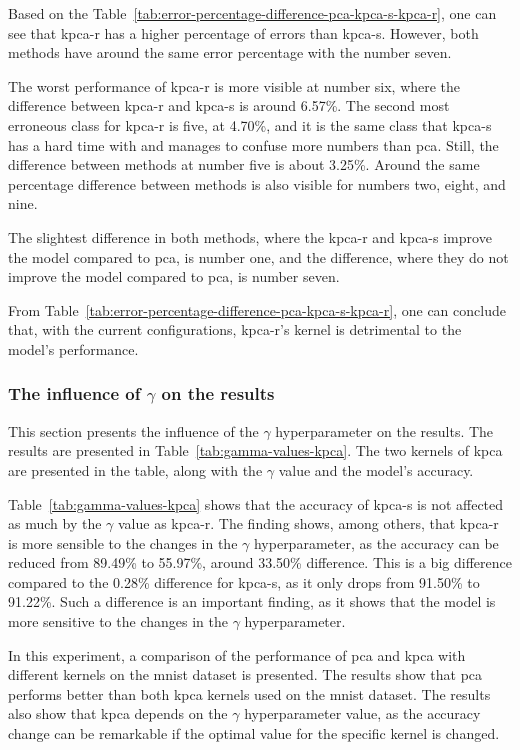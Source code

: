 Based on the Table~\ref{tab:error-percentage-difference-pca-kpca-s-kpca-r}, one can see that \gls{kpca-r} has a higher percentage of errors than \gls{kpca-s}. However, both methods have around the same error percentage with the number seven.

The worst performance of \gls{kpca-r} is more visible at number six, where the difference between \gls{kpca-r} and \gls{kpca-s} is around 6.57\%. The second most erroneous class for \gls{kpca-r} is five, at 4.70\%, and it is the same class that \gls{kpca-s} has a hard time with and manages to confuse more numbers than \gls{pca}. Still, the difference between methods at number five is about 3.25\%. Around the same percentage difference between methods is also visible for numbers two, eight, and nine.

The slightest difference in both methods, where the \gls{kpca-r} and \gls{kpca-s} improve the model compared to \gls{pca}, is number one, and the difference, where they do not improve the model compared to \gls{pca}, is number seven.

From Table~\ref{tab:error-percentage-difference-pca-kpca-s-kpca-r}, one can conclude that, with the current configurations, \gls{kpca-r}'s kernel is detrimental to the model's performance.

\subsubsection{The influence of $\gamma$ on the results}\label{subsubsec:gamma-influence}
This section presents the influence of the $\gamma$ hyperparameter on the results. The results are presented in Table~\ref{tab:gamma-values-kpca}. The two kernels of \gls{kpca} are presented in the table, along with the $\gamma$ value and the model's accuracy.



Table~\ref{tab:gamma-values-kpca} shows that the accuracy of \gls{kpca-s} is not affected as much by the $\gamma$ value as \gls{kpca-r}. The finding shows, among others, that \gls{kpca-r} is more sensible to the changes in the $\gamma$ hyperparameter, as the accuracy can be reduced from 89.49\% to 55.97\%, around 33.50\% difference. This is a big difference compared to the 0.28\% difference for \gls{kpca-s}, as it only drops from 91.50\% to 91.22\%. Such a difference is an important finding, as it shows that the model is more sensitive to the changes in the $\gamma$ hyperparameter.

In this experiment, a comparison of the performance of \gls{pca} and \gls{kpca} with different kernels on the \gls{mnist} dataset is presented. The results show that \gls{pca} performs better than both \gls{kpca} kernels used on the \gls{mnist} dataset. The results also show that \gls{kpca} depends on the $\gamma$ hyperparameter value, as the accuracy change can be remarkable if the optimal value for the specific kernel is changed.